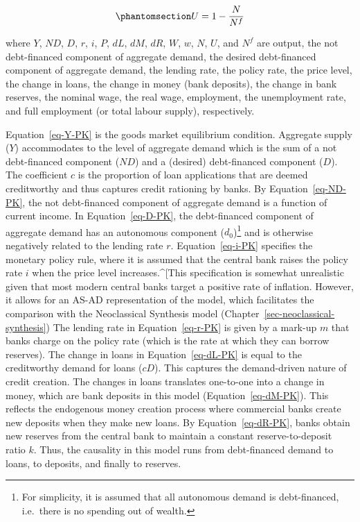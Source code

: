 \documentclass[
  letterpaper,
  DIV=11,
  numbers=noendperiod]{scrreprt}
\begin{document}
\begin{equation}\phantomsection\label{eq-U-PK}{
U=1-\frac{N}{N^f}
}\end{equation}

where \(Y\), \(ND\), \(D\), \(r\), \(i\), \(P\), \(dL\), \(dM\), \(dR\),
\(W\), \(w\), \(N\), \(U\), and \(N^f\) are output, the not
debt-financed component of aggregate demand, the desired debt-financed
component of aggregate demand, the lending rate, the policy rate, the
price level, the change in loans, the change in money (bank deposits),
the change in bank reserves, the nominal wage, the real wage,
employment, the unemployment rate, and full employment (or total labour
supply), respectively.

Equation~\ref{eq-Y-PK} is the goods market equilibrium condition.
Aggregate supply (\(Y\)) accommodates to the level of aggregate demand
which is the sum of a not debt-financed component (\(ND\)) and a
(desired) debt-financed component (\(D\)). The coefficient \(c\) is the
proportion of loan applications that are deemed creditworthy and thus
captures credit rationing by banks. By Equation~\ref{eq-ND-PK}, the not
debt-financed component of aggregate demand is a function of current
income. In Equation~\ref{eq-D-PK}, the debt-financed component of
aggregate demand has an autonomous component (\(d_0\))\footnote{For
  simplicity, it is assumed that all autonomous demand is debt-financed,
  i.e.~there is no spending out of wealth.} and is otherwise negatively
related to the lending rate \(r\). Equation~\ref{eq-i-PK} specifies the
monetary policy rule, where it is assumed that the central bank raises
the policy rate \(i\) when the price level increases.\^{}{[}This
specification is somewhat unrealistic given that most modern central
banks target a positive rate of inflation. However, it allows for an
AS-AD representation of the model, which facilitates the comparison with
the Neoclassical Synthesis model
(Chapter~\ref{sec-neoclassical-synthesis}) The lending rate in
Equation~\ref{eq-r-PK} is given by a mark-up \(m\) that banks charge on
the policy rate (which is the rate at which they can borrow reserves).
The change in loans in Equation~\ref{eq-dL-PK} is equal to the
creditworthy demand for loans (\(cD\)). This captures the demand-driven
nature of credit creation. The changes in loans translates one-to-one
into a change in money, which are bank deposits in this model
(Equation~\ref{eq-dM-PK}). This reflects the endogenous money creation
process where commercial banks create new deposits when they make new
loans. By Equation~\ref{eq-dR-PK}, banks obtain new reserves from the
central bank to maintain a constant reserve-to-deposit ratio \(k\).
Thus, the causality in this model runs from debt-financed demand to
loans, to deposits, and finally to reserves.
\end{document}
